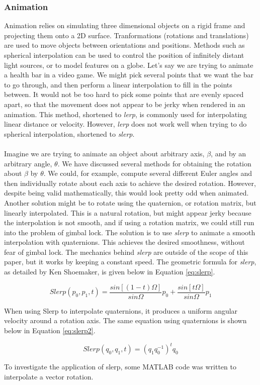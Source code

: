 \subsubsection{Animation}
Animation relies on simulating three dimensional objects on a rigid frame and projecting them onto a 2D surface.
Tranformations (rotations and translations) are used to move objects between orientations and positions.
Methods such as spherical interpolation can be used to control the position of infinitely distant light sources, or to model features on a globe.
Let's say we are trying to animate a health bar in a video game.
We might pick several points that we want the bar to go through, and then perform a linear interpolation to fill in the points between.
It would not be too hard to pick some points that are evenly spaced apart, so that the movement does not appear to be jerky when rendered in an animation.
This method, shortened to \textit{lerp}, is commonly used for interpolating linear distance or velocity.
However, \textit{lerp} does not work well when trying to do spherical interpolation, shortened to \textit{slerp}.
\\ \\ Imagine we are trying to animate an object about arbitrary axis, $\beta$, and by an arbitrary angle, $\theta$.
We have discussed several methods for obtaining the rotation about $\beta$ by $\theta$.
We could, for example, compute several different Euler angles and then individually rotate about each axis to achieve the desired rotation.
However, despite being valid mathematically, this would look pretty odd when animated.
Another solution might be to rotate using the quaternion, or rotation matrix, but linearly interpolated.
This is a natural rotation, but might appear jerky because the interpolation is not smooth, and if using a rotation matrix, we could still run into the problem of gimbal lock.
The solution is to use \textit{slerp} to animate a smooth interpolation with quaternions.
This achieves the desired smoothness, without fear of gimbal lock.
The mechanics behind \textit{slerp} are outside of the scope of this paper, but it works by keeping a constant speed.
The geometric formula for \textit{slerp}, as detailed by Ken Shoemaker, is given below in Equation \ref{eq:slerp}.

\begin{equation}
	Slerp(p_0, p_1, t) = \frac{sin[(1-t)\Omega]}{sin\Omega}p_0 + \frac{sin[t\Omega]}{sin\Omega}p_1
	\label{eq:slerp}
\end{equation}

When using Slerp to interpolate quaternions, it produces a uniform angular velocity around a rotation axis.
The same equation using quaternions is shown below in Equation \ref{eq:slerp2}.

\begin{equation}
	Slerp(q_0, q_1, t) = (q_1q_0^{-1})^tq_0
\label{eq:slerp2}
\end{equation}

To investigate the application of slerp, some MATLAB code was written to interpolate a vector rotation.
